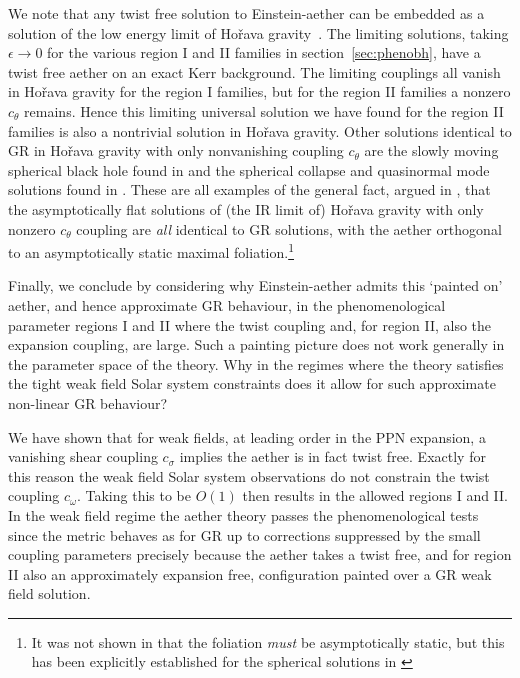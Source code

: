 \documentclass[12pt]{article}
\numberwithin{equation}{section}
\begin{document}
We note that any twist free solution to Einstein-aether can be embedded as a solution of the low energy limit of Ho\v{r}ava gravity~\cite{Jacobson:2010mx}.
The limiting solutions, taking $\epsilon \to 0$ for the various region I and II families in section~\ref{sec:phenobh}, have a twist free aether on an exact Kerr background. 
The limiting couplings all vanish in Ho\v{r}ava gravity for the region I families, but
for the region II families a nonzero $c_\theta$ remains. Hence this limiting universal solution we have found for the region II families is also a nontrivial solution in Ho\v{r}ava gravity.
Other solutions identical to GR in Ho\v{r}ava gravity with only nonvanishing coupling $c_\theta$ are the slowly moving spherical black hole found in \cite{Ramos:2018oku}
and the spherical collapse and quasinormal mode 
solutions found in \cite{Franchini:2021bpt}. 
These are all examples of the general fact,
argued in \cite{Bellorin:2010je}, that the asymptotically flat solutions of (the IR limit of) Ho\v{r}ava gravity with only nonzero $c_\theta$ coupling are {\it all} identical to GR solutions, with the aether orthogonal to an asymptotically static maximal foliation.\footnote{It was not shown in \cite{Bellorin:2010je} that the foliation {\it must} be asymptotically static, but this has been explicitly established for the spherical solutions in \cite{Franchini:2021bpt}}





Finally, we conclude 
by considering why Einstein-aether admits this `painted on' aether, and hence approximate GR behaviour, in the phenomenological parameter regions I and II where the twist coupling and, for region II, also the 
expansion coupling, are large.
Such a painting picture does not work generally in the parameter space of the theory. Why in the regimes where the theory satisfies the tight weak field Solar system constraints does it allow for such approximate non-linear GR behaviour?

We have shown that for weak fields, at leading order in the PPN expansion, a vanishing shear coupling $c_\sigma$ implies the aether is in fact twist free. Exactly for this reason the weak field Solar system observations do not constrain the twist coupling $c_\omega$. Taking this to be $O(1)$ then results in the allowed regions I and II. In the weak field regime the aether theory passes the phenomenological tests since the metric behaves 
as for GR up to corrections suppressed by the small coupling parameters
precisely because the aether takes a twist free, and for region II also an approximately expansion free, configuration painted over a GR weak field solution. 
\end{document}
